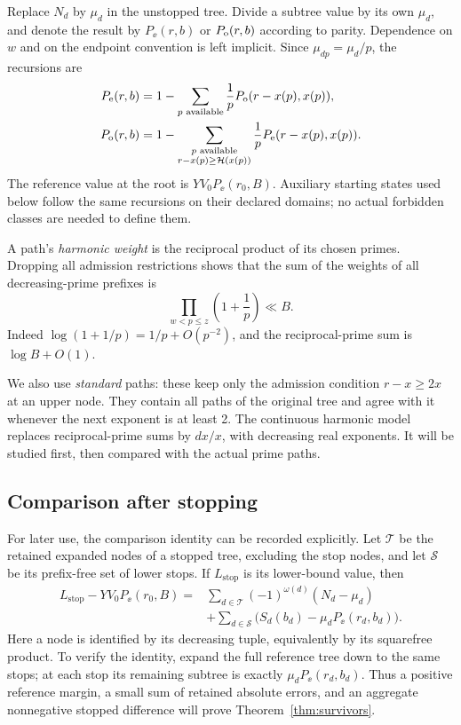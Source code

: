 Replace $N_d$ by $\mu_d$ in the unstopped tree. Divide a subtree value
by its own $\mu_d$, and denote the result by $P_\ee(r,b)$ or
$P_\mathrm o(r,b)$ according to parity. Dependence on $w$ and on the
endpoint convention is left implicit. Since $\mu_{dp}=\mu_d/p$,
the recursions are
\begin{equation}\label{eq:reference-tree}
\begin{split}
 P_\mathrm e(r,b)&=1-\sum_{p\text{ available}}\frac1p
                         P_\mathrm o(r-x(p),x(p)),\\
 P_\mathrm o(r,b)&=1-
 \sum_{\substack{p\text{ available}\\r-x(p)\ge \mathcal H(x(p))}}
 \frac1p P_\mathrm e(r-x(p),x(p)).
\end{split}
\end{equation}
The reference value at the root is $YV_0P_\ee(r_0,B)$.
Auxiliary starting states used below follow the same recursions on
their declared domains; no actual forbidden classes are needed to
define them.

A path's \emph{harmonic weight} is the reciprocal product of its
chosen primes. Dropping all admission restrictions shows that the
sum of the weights of all decreasing-prime prefixes is
\begin{equation}\label{eq:total-prefix-mass}
 \prod_{w<p\le z}\left(1+\frac1p\right)\ll B.
\end{equation}
Indeed $\log(1+1/p)=1/p+O(p^{-2})$, and the reciprocal-prime sum is
$\log B+O(1)$.

We also use \emph{standard} paths: these keep only the admission
condition $r-x\ge2x$ at an upper node. They contain all paths of
the original tree and agree with it whenever the next exponent is
at least 2. The continuous harmonic model replaces reciprocal-prime
sums by $dx/x$, with decreasing real exponents. It will be studied
first, then compared with the actual prime paths.

\subsection{Comparison after stopping}

For later use, the comparison identity can be recorded explicitly.
Let $\mathcal T$ be the retained expanded nodes of a stopped tree,
excluding the stop nodes, and let $\mathcal S$ be its prefix-free
set of lower stops. If $L_{\mathrm{stop}}$ is its lower-bound value,
then
\begin{equation}\label{eq:stopped-comparison-identity}
\begin{split}
 L_{\mathrm{stop}}-YV_0P_\ee(r_0,B)
 ={}&\sum_{d\in\mathcal T}(-1)^{\omega(d)}(N_d-\mu_d)\\
 &+\sum_{d\in\mathcal S}
 \bigl(S_d(b_d)-\mu_dP_\ee(r_d,b_d)\bigr).
\end{split}
\end{equation}
Here a node is identified by its decreasing tuple, equivalently by
its squarefree product. To verify the identity, expand the full
reference tree down to the same stops; at each stop its remaining
subtree is exactly $\mu_dP_\ee(r_d,b_d)$. Thus a positive reference
margin, a small sum of retained absolute errors, and an aggregate
nonnegative stopped difference will prove
Theorem~\ref{thm:survivors}.
